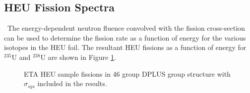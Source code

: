\subsection{HEU Fission Spectra}

\ The energy-dependent neutron fluence convolved with the fission cross-section can be used to determine the fission rate as a function of energy for the various isotopes in the HEU foil.
The resultant HEU fissions as a function of energy for $\mathrm{^{235}}$U and $\mathrm{^{238}}$U are shown in Figure \ref{fig:flux51}.  

\begin{figure}[!htbp]
	\centering
	\vfill
	\vfill
	\vfill
	\caption{ETA HEU sample fissions in 46 group DPLUS group structure with $\sigma_{sys}$ included in the results.}
	\label{fig:flux51}
\end{figure}

